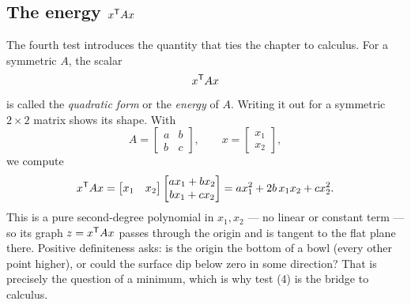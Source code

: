 \subsection{The energy \texorpdfstring{$x^{\mathsf T} Ax$}{xTAx}}

The fourth test introduces the quantity that ties the chapter to calculus. For a symmetric $A$, the scalar
\[
   x^{\mathsf T} A x
\]
is called the \emph{quadratic form} or the \emph{energy} of $A$. Writing it out for a symmetric $2\times2$ matrix shows its shape. With
\[
   A=\begin{bmatrix} a & b\\ b & c\end{bmatrix},
   \qquad x=\begin{bmatrix} x_1\\ x_2\end{bmatrix},
\]
we compute
\[
   x^{\mathsf T} A x
   =\begin{bmatrix} x_1 & x_2\end{bmatrix}
    \begin{bmatrix} a x_1+b x_2\\ b x_1+c x_2\end{bmatrix}
   =a x_1^2+2b\,x_1 x_2+c x_2^2 .
\]
This is a pure second-degree polynomial in $x_1,x_2$ --- no linear or constant term --- so its graph $z=x^{\mathsf T} Ax$ passes through the origin and is tangent to the flat plane there. Positive definiteness asks: is the origin the bottom of a bowl (every other point higher), or could the surface dip below zero in some direction? That is precisely the question of a minimum, which is why test (4) is the bridge to calculus.



